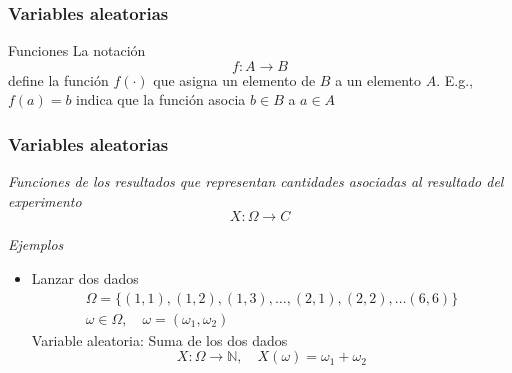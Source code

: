 \documentclass[xcolor=dvipsnames,10pt]{beamer}
\begin{document}
%
\begin{frame}
  \frametitle{Variables aleatorias}
  \begin{definicion*}{Funciones}{}
    La notación
    \begin{equation*}
      f \colon A \to B
    \end{equation*}
    define la función $f(\cdot)$ que asigna un elemento de $B$ a un elemento $A$.  E.g., $f(a) = b$ indica que la función asocia $b \in B$ a $a \in A$
    \begin{figure}
      \centering
    \end{figure}
  \end{definicion*}
\end{frame}
%
\begin{frame}
  \frametitle{Variables aleatorias}
  \begin{tcolorbox}
    \emph{Funciones de los resultados que representan cantidades asociadas al resultado del experimento}
    \tcblower
    \begin{equation*}
      X \colon \Omega \to C
    \end{equation*}
  \end{tcolorbox}
  \emph{Ejemplos}
  \begin{itemize}
  \item Lanzar dos dados
    \begin{gather*}
      \Omega = \{ (1, 1), (1, 2), (1, 3), \dots, (2, 1), (2, 2), \dots (6, 6) \}\\
      \omega \in \Omega, \quad \omega = (\omega_1, \omega_2)
    \end{gather*}
    Variable aleatoria: Suma de los dos dados
    \begin{equation*}
      X \colon \Omega \to \mathbb{N}, \quad X(\omega) = \omega_1 + \omega_2
    \end{equation*}
  \end{itemize}
\end{frame}
\end{document}
